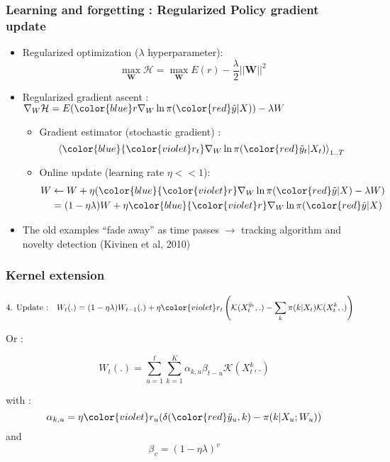 \documentclass{beamer}
\begin{document}
\begin{frame}\frametitle{Learning and forgetting : Regularized Policy gradient update}
	\vspace{-.8cm}
	\begin{itemize}
		\item Regularized optimization ($\lambda$ hyperparameter):
		\vspace{-.4cm} 
		$$\max _{\boldsymbol{W}} \mathcal{H} = \max _{\boldsymbol{W}} E(r) - \frac{\lambda}{2}||\boldsymbol{W}||^2$$
		\vspace{-.4cm}
		\item Regularized gradient ascent : 
		\footnotesize{$\nabla_W \mathcal{H} = {E}({\color{blue}r\nabla_W\ln\pi({\color{red}\tilde{y}}|X)}) - \lambda W$ }
		\begin{itemize}
			\item Gradient estimator (stochastic gradient) :
			\vspace{-.2cm} 
			$$
			\left\langle {\color{blue}{\color{violet}r_t} \nabla_W\ln\pi({\color{red}\tilde{y}_t}|X_t)}\right\rangle_{1..T} $$
			\item Online update (learning rate $\eta << 1$):
			\vspace{-.2cm} 
			\begin{align}
			W &\leftarrow W + \eta ( {\color{blue}{\color{violet}r} \nabla_W\ln\pi({\color{red}\tilde{y}}|X)} - \lambda W) \nonumber \\
			&= (1 - \eta \lambda) W + \eta {\color{blue}{\color{violet}r} \nabla_W\ln\pi({\color{red}\tilde{y}}|X)} \nonumber
			\end{align}
		\end{itemize}
		\vspace{-.2cm}
		\item The old examples ``fade away'' as time passes
		$\rightarrow$ tracking algorithm and novelty detection (Kivinen et al, 2010)
	\end{itemize}
\end{frame}

\begin{frame}\frametitle{Kernel extension}
\begin{exampleblock}{}
\footnotesize
\begin{align*}
&\text{4. Update :} 
&& W_t(.) = (1 - \eta \lambda) W_{t-1}(.) + \eta {\color{violet}r_t} \left(\mathcal{K}(X_t^{\tilde{y}_t},.) - \sum_k \pi(k|X_t) \mathcal{K}(X_t^k,.) \right) 
\end{align*}
\normalsize
\end{exampleblock}
Or :
\begin{exampleblock}{}
	$$W_t(.) = \sum_{u=1}^{t} \sum_{k=1}^K \alpha_{k,u} \beta_{t-u} \mathcal{K}(X^k_t,.)$$
\end{exampleblock}
	with : 
	$$ \alpha_{k,u} = \eta {\color{violet}r_u} (\delta({\color{red}\tilde{y}_u},k) - \pi(k|X_u;W_u))$$
	and
	$$
	\beta_v = (1-\eta\lambda)^v
	$$   
\end{frame}
\end{document}
